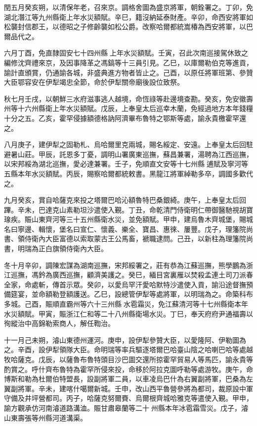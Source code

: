 \begin{pinyinscope}
閏五月癸亥朔，以清保年老，召來京。調格舍圖為盛京將軍，朝銓署之。丁卯，免湖北潛江等九州縣衛上年水災額賦。辛巳，籍沒納延泰財產。辛卯，命西安將軍如松襲封信郡王，以德昭之子修齡襲如松公爵。改察哈爾都統嵩椿為西安將軍，以巴爾品代之。

六月丁酉，免直隸固安七十四州縣上年水災額賦。壬寅，召此次南巡接駕休致之編修沈齊禮來京，及因事降革之馮鎬等十三員引見。乙巳，以庫爾勒伯克等進貢，諭計直頒賞，仍通諭各城，非盛典進方物者皆止之。己酉，以原任將軍班第、參贊大臣鄂容安在伊犁竭忠全節，命於伊犁關帝廟後設位致祭。

秋七月壬戌，以朝鮮三水府滋事逃人越境，命恆祿等赴邊境查勘。癸亥，免安徽壽州等十六州縣衛上年水災額賦。戊辰，上奉皇太后巡幸木蘭，免經過地方本年錢糧十分之五。乙亥，霍罕侵據額德格訥阿濟畢布魯特之鄂斯等處，諭永貴檄霍罕還之。

八月庚子，建伊犁之固勒札、烏哈爾里克兩城，賜名綏定、安遠。上奉皇太后回駐避暑山莊。甲辰，託恩多丁憂，調明山署廣東巡撫，蘇昌兼署，湯聘為江西巡撫，以宋邦綏為湖北巡撫，愛必達兼署。壬子，免順直文安等十七州縣逋賦及寧河等五縣本年水災額賦。丙辰，賜察哈爾都統敕書。黑龍江將軍綽勒多卒，調國多歡代之。

九月癸亥，賞自哈薩克來投之塔爾巴哈沁額魯特巴桑銀綺。庚午，上奉皇太后回蹕。辛未，巴達克山素勒坦沙遣使入覲。丁丑，命乾清門侍衛明仁帶御醫馳視胡寶瑔疾。賑山東齊河等三十五州縣衛水災，並免額賦。甲申，建烏魯木齊城堡，賜城名曰寧邊、輯懷，堡名曰宣仁、懷義、樂全、寶昌、惠徠、屢豐。戊子，理籓院尚書、領侍衛內大臣富德以索取蒙古王公馬畜，褫職逮問。己丑，以新柱為理籓院尚書，明瑞為正白旗領侍衛內大臣。

冬十月辛卯，調陳宏謀為湖南巡撫，宋邦綏署之，莊有恭為江蘇巡撫，熊學鵬為浙江巡撫，馮鈐為廣西巡撫，顧濟美護之。癸巳，緬目宮裏雁以焚殺孟連土司刀派春全家，命處斬，傳首示眾。癸卯，以愛烏罕汗愛哈默特沙遣使入貢，諭沿途督撫預備筵宴，並命額勒登額護送。乙巳，設總管伊犁等處將軍，以明瑞為之。命築科布多城。己酉，賑順直霸州等六十三州縣水雹霜災，免江蘇清河等十七州縣衛本年水災額賦。甲寅，賑浙江仁和等二十八州縣衛場水災。丁巳，奉天府府尹通福壽以徇縱治中高錦勒索商人，解任鞫治。

十一月己未朔，濬山東德州運河。庚申，設伊犁參贊大臣，以愛隆阿、伊勒圖為之。辛酉，設伊犁領隊大臣。命明瑞等率兵驅逐塔爾巴哈臺山陰之哈喇巴哈等處越牧哈薩克。戊辰，以薩魯布魯特頭目沙巴圖交還所掠霍罕貿易人等馬匹，諭永貴等酌賞之。呼什齊布魯特為霍罕所侵來投，命移於阿拉克圖呼勒等處游牧。庚午，命博斯和勒為杜爾伯特盟長，設副將軍二員，以車凌烏巴什為右翼副將軍，巴桑為左翼副將軍。辛未，建喀什噶爾新城。壬申，改山西平魯營參將為都司，裁原設中軍守備及井坪營都司。丙子，哈薩克努爾賚、烏爾根齊城哈雅克等遣使入覲。甲申，諭方觀承仿河南濬道路溝洫。賑甘肅皋蘭等二十州縣本年冰雹霜雪災。戊子，濬山東壽張等州縣河道溝渠。


\end{pinyinscope}
